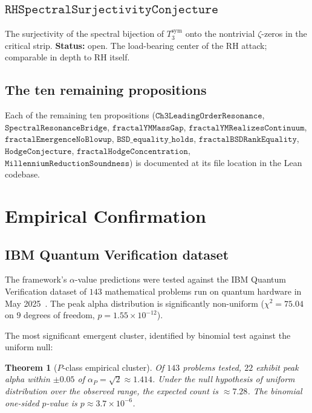 \documentclass[11pt,a4paper]{article}
\newtheorem{theorem}{Theorem}[section]
\theoremstyle{definition}
\theoremstyle{remark}
\begin{document}
\subsection{$\mathtt{RHSpectralSurjectivityConjecture}$}
The surjectivity of the spectral bijection of $T_3^{\mathrm{sym}}$
onto the nontrivial $\zeta$-zeros in the critical strip.
\textbf{Status:} open. The load-bearing center of the RH attack;
comparable in depth to RH itself.

\subsection{The ten remaining propositions}
Each of the remaining ten propositions ($\mathtt{Ch3LeadingOrderResonance}$,
$\mathtt{SpectralResonanceBridge}$, $\mathtt{fractalYMMassGap}$,
$\mathtt{fractalYMRealizesContinuum}$, $\mathtt{fractalEmergenceNoBlowup}$,
$\mathtt{BSD\_equality\_holds}$, $\mathtt{fractalBSDRankEquality}$,
$\mathtt{HodgeConjecture}$, $\mathtt{fractalHodgeConcentration}$,
$\mathtt{MillenniumReductionSoundness}$) is documented at its file
location in the Lean codebase.

\section{Empirical Confirmation}

\subsection{IBM Quantum Verification dataset}

The framework's $\alpha$-value predictions were tested against the IBM
Quantum Verification dataset of $143$ mathematical problems run on
quantum hardware in May 2025~\cite{cohen2025ibm}. The peak alpha
distribution is significantly non-uniform ($\chi^2 = 75.04$ on $9$
degrees of freedom, $p = 1.55 \times 10^{-12}$).

The most significant emergent cluster, identified by binomial test
against the uniform null:

\begin{theorem}[$P$-class empirical cluster]\label{thm:p-cluster}
Of $143$ problems tested, $22$ exhibit peak alpha within $\pm 0.05$ of
$\alpha_P = \sqrt{2} \approx 1.414$. Under the null hypothesis of
uniform distribution over the observed range, the expected count is
$\approx 7.28$. The binomial one-sided $p$-value is $p \approx 3.7
\times 10^{-6}$.
\end{theorem}
\end{document}
